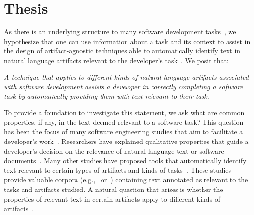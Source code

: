 

\section{Thesis}
\label{cp1:thesis}





As there is an underlying structure to many software development tasks~\cite{Murphy2005},
we hypothesize that one can use information about a task and its context to assist in 
the design of artifact-agnostic techniques able to  
automatically identify text in natural language artifacts relevant to the developer's task~\cite{Starke2009, Bavota2016}. We posit that:


\medskip
\begin{bluequote}
    \textit{A technique that applies to different kinds of natural language artifacts associated with software development assists a developer in correctly completing a software task by 
    automatically providing them with text relevant to their task.  }
\end{bluequote}
\medskip



To provide a foundation to investigate this statement, we ask what are common properties, if any, in the text deemed relevant to a software task? This question has been the focus of many software engineering studies that aim 
to facilitate a developer's work~\cite{Piorkowski2015, Piorkowski2016, chi2007, Ko2006a}.
Researchers have explained qualitative properties that 
guide a developer's decision on the relevance of natural language text 
or software documents~\cite{Forward2002, BenCharrada2016, Starke2009, DeGraaf2014}. 
Many other studies have proposed tools that automatically identify text 
relevant to certain types of artifacts and kinds of tasks~\cite{Chaparro2017, Robillard2015, Xu2017}. 
These studies provide valuable corpora (e.g.,~\cite{nadi2019Rep} or~\cite{Rastkar2010})
containing text annotated as relevant to the tasks and artifacts studied. 
A natural question that arises is whether the properties 
of relevant text in certain artifacts apply to different kinds of artifacts~\cite{hutchinson2021, bird2009}. 


